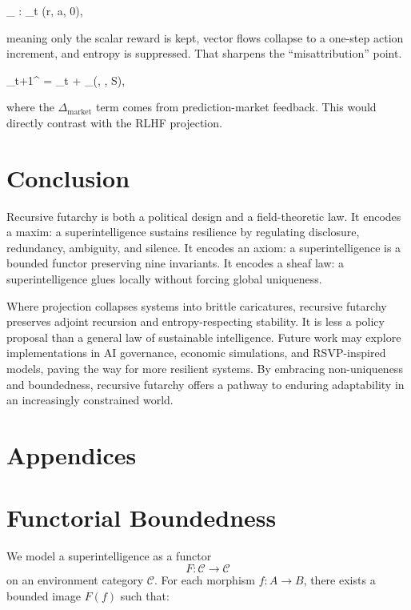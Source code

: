 \documentclass{article}
\begin{document}
\pi_ : _t \mapsto (\pm r, \delta a, 0),

meaning only the scalar reward is kept, vector flows collapse to a one-step action increment, and entropy is suppressed. That sharpens the “misattribution” point.

_{t+1}^ = _t + \Delta_(\Phi, , S),

where the $\Delta_\text{market}$ term comes from prediction-market feedback. This would directly contrast with the RLHF projection.

\section{Conclusion}

Recursive futarchy is both a political design and a field-theoretic law. It encodes a maxim: a superintelligence sustains resilience by regulating disclosure, redundancy, ambiguity, and silence. It encodes an axiom: a superintelligence is a bounded functor preserving nine invariants. It encodes a sheaf law: a superintelligence glues locally without forcing global uniqueness.

Where projection collapses systems into brittle caricatures, recursive futarchy preserves adjoint recursion and entropy-respecting stability. It is less a policy proposal than a general law of sustainable intelligence. Future work may explore implementations in AI governance, economic simulations, and RSVP-inspired models, paving the way for more resilient systems. By embracing non-uniqueness and boundedness, recursive futarchy offers a pathway to enduring adaptability in an increasingly constrained world.

\newpages
\appendix
\section*{Appendices}

\section{Functorial Boundedness}
\label{app:functorial-boundedness}

We model a superintelligence as a functor
\[
F : \mathcal{C} \to \mathcal{C}
\]
on an environment category $\mathcal{C}$.
For each morphism $f: A \to B$, there exists a bounded image $F(f)$ such that:
\end{document}
